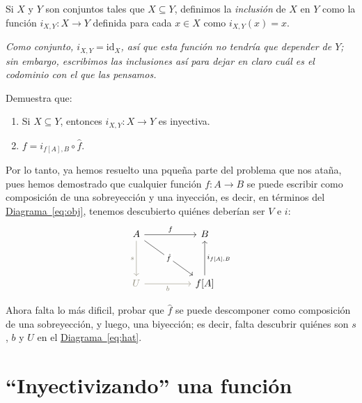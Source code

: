 \documentclass[letterpaper,DIV=14,headsepline,12pt]{scrartcl}
\newcommand{\pts}{}
\newenvironment{ejercicio}[1]{\ifthenelse{\equal{#1}{1} \OR
\equal{#1}{+1}}{\renewcommand{\pts}{\textbf{(#1
pt)}}}{\renewcommand{\pts}{\textbf{(#1 pts)}}}\begin{ejj}\upshape
\pts}{\end{ejj}}
\newcommand{\id}{\mathrm{id}} \newcommand{\op}{{}^{\mathrm{op}}}
\begin{document}
    \begin{definicion}
        Si $X$ y $Y$ son conjuntos tales que $X \subseteq Y$, definimos la
        \textit{inclusión} de $X$ en $Y$ como la función $i_{X,Y}\colon X \to Y$
        definida para cada $x \in X$ como $i_{X,Y}(x) = x$.

        \textit{Como conjunto, $i_{X,Y}=\id_X$, así que esta función no tendría
        que depender de $Y$; sin embargo, escribimos las inclusiones así para
        dejar en claro cuál es el codominio con el que las pensamos.}
    \end{definicion}

    \begin{ejercicio}{1.5}
        Demuestra que:
        \begin{enumerate}
            \item Si $X \subseteq Y$, entonces $i_{X,Y}\colon X \to Y$ es inyectiva.
            \item $f=i_{f[A],B} \circ \hat{f}$.
        \end{enumerate}
    \end{ejercicio}

    Por lo tanto, ya hemos resuelto una pqueña parte del problema que nos ataña,
    pues hemos demostrado que cualquier función $f\colon A \to B$ se puede escribir
    como composición de una sobreyección y una inyección, es decir, en términos
    del \hyperref[eq:obj]{Diagrama~\ref*{eq:obj}}, tenemos descubierto quiénes
    deberían ser $V$ e $i$:
    \begin{equation}\label{eq:hat}
        \begin{tikzcd}
            A && B \\
            \\
            \textcolor{Cornsilk4}{U} && {f[A]}
            \arrow["f", from=1-1, to=1-3]
            \arrow["s"', from=1-1, to=3-1, draw=Cornsilk4, text=Cornsilk4]
            \arrow["{\hat{f}}"{description}, from=1-1, to=3-3]
            \arrow["b"', from=3-1, to=3-3, draw=Cornsilk4, text=Cornsilk4]
            \arrow["{i_{f[A],B}}"', from=3-3, to=1-3]
        \end{tikzcd}
    \end{equation}

    Ahora falta lo más dificil, probar que $\hat{f}$ se puede descomponer como
    composición de una sobreyección, y luego, una biyección; es decir, falta
    descubrir quiénes son $s$, $b$ y $U$ en el
    \hyperref[eq:hat]{Diagrama~\ref*{eq:hat}}.

    \section*{``Inyectivizando'' una función}
\end{document}

